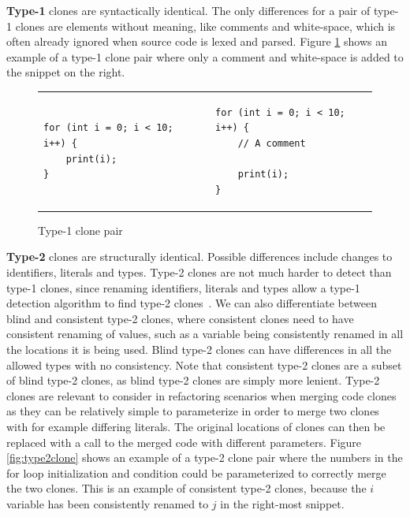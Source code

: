 \textbf{Type-1} clones are syntactically identical. The only differences for a pair of
type-1 clones are elements without meaning, like comments and white-space, which is often
already ignored when source code is lexed and parsed. Figure \ref{fig:type1clone} shows an
example of a type-1 clone pair where only a comment and white-space is added to the
snippet on the right.

\begin{figure}[t]
	\begin{center}
        \begin{tabular}{p{5.1cm} | p{5.1cm}}
			\begin{lstlisting}
for (int i = 0; i < 10;   i++) {
    print(i);
}
\end{lstlisting} &
			\begin{lstlisting}
for (int i = 0; i < 10; i++) {
    // A comment

    print(i);
}
            \end{lstlisting}
		\end{tabular}
	\end{center}
    \caption{Type-1 clone pair}
    \label{fig:type1clone}
\end{figure}


\textbf{Type-2} clones are structurally identical. Possible differences include changes to
identifiers, literals and types. Type-2 clones are not much harder to detect than type-1
clones, since renaming identifiers, literals and types allow a type-1 detection algorithm
to find type-2 clones~\cite{Bakerdup}. We can also differentiate between blind and
consistent type-2 clones, where consistent clones need to have consistent renaming of
values, such as a variable being consistently renamed in all the locations it is being
used. Blind type-2 clones can have differences in all the allowed types with no
consistency. Note that consistent type-2 clones are a subset of blind type-2 clones, as
blind type-2 clones are simply more lenient. Type-2 clones are relevant to consider in
refactoring scenarios when merging code clones as they can be relatively simple to
parameterize in order to merge two clones with for example differing literals. The
original locations of clones can then be replaced with a call to the merged code with
different parameters. Figure \ref{fig:type2clone} shows an example of a type-2 clone pair
where the numbers in the for loop initialization and condition could be parameterized to
correctly merge the two clones. This is an example of consistent type-2 clones, because
the $i$ variable has been consistently renamed to $j$ in the right-most snippet.

